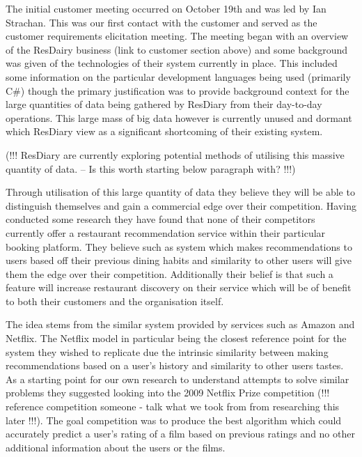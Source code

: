 \documentclass{l3proj}
\begin{document}

The initial customer meeting occurred on October 19th and was led by Ian Strachan. This was our first contact with the customer and served as the customer requirements elicitation meeting. The meeting began with an overview of the ResDairy business (link to customer section above) and some background was given of the technologies of their system currently in place. This included some information on the particular development languages being used (primarily C\#) though the primary justification was to provide background context for the large quantities of data being gathered by ResDiary from their day-to-day operations. This large mass of big data however is currently unused and dormant which ResDiary view as a significant shortcoming of their existing system. 

(!!! ResDiary are currently exploring potential methods of utilising this massive quantity of data. -- Is this worth starting below paragraph with?  !!!)

Through utilisation of this large quantity of data they believe they will be able to distinguish themselves and gain a commercial edge over their competition. Having conducted some research they have found that none of their competitors currently offer a restaurant recommendation service within their particular booking platform. They believe such as system which makes recommendations to users based off their previous dining habits and similarity to other users will give them the edge over their competition. Additionally their belief is that such a feature will increase restaurant discovery on their service which will be of benefit to both their customers and the organisation itself.

The idea stems from the similar system provided by services such as Amazon and Netflix. The Netflix model in particular being the closest reference point for the system they wished to replicate due the intrinsic similarity between making recommendations based on a user’s history and similarity to other users tastes. As a starting point for our own research to understand attempts to solve similar problems they suggested looking into the 2009 Netflix Prize competition (!!! reference competition someone - talk what we took from from researching this later !!!). The goal competition was to produce the best algorithm which could accurately predict a user’s rating of a film based on previous ratings and no other additional information about the users or the films.
\end{document}
